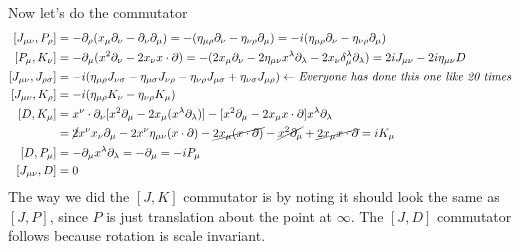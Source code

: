 \documentclass[11pt]{article}
\begin{document}
\begin{enumerate}
	Now let's do the commutator 
	\[
	\begin{aligned}
		\, [J_{\mu \nu}, P_\rho] &= - \partial_\rho (x_{\mu} \partial_\nu - \partial_\nu \partial_\mu) = - (\eta_{\mu \rho} \partial_\nu - \eta_{\nu \rho} \partial_\mu) = - i (\eta_{\mu \rho} \partial_\nu - \eta_{\nu \rho} \partial_\mu)\\
		[P_\mu, K_\nu] &= - \partial_{\mu} (x^2 \partial_\nu - 2 x_\nu x \cdot \partial) = - (2 x_\mu \partial_\nu - 2 \eta_{\mu \nu} x^\lambda \partial_\lambda - 2 x_\nu \delta_\mu^\lambda \partial_\lambda) = 2 i J_{\mu \nu} - 2 i \eta_{\mu \nu} D\\
		[J_{\mu \nu}, J_{\rho \sigma}] &= -i (\eta_{\mu \rho} J_{\nu \sigma} - \eta_{\mu \sigma} J_{\nu \rho} - \eta_{\nu \rho} J_{\mu \sigma} + \eta_{\nu \sigma} J_{\mu \rho}) \leftarrow\textit{Everyone has done this one like 20 times}\\
		[J_{\mu \nu}, K_\rho] &= -i (\eta_{\mu \rho} K_\nu - \eta_{\nu \rho} K_\mu ) \\
		[D, K_\mu] &= x^\nu \cdot \partial_\nu [x^2 \partial_\mu - 2 x_\mu (x^\lambda \partial_\lambda)] - [x^2 \partial_\mu - 2x_\mu x \cdot \partial] x^\lambda \partial_\lambda \\
		&= \cancel{2} x^\nu x_\nu \partial_\mu - 2 x^\nu \eta_{\mu \nu} (x \cdot \partial) - \cancel{2 x_\mu (x \cdot \partial)} - \cancel{x^2 \partial_\mu} + \cancel{2 x_\mu x \cdot \partial} =  i K_\mu\\
		[D, P_\mu] &= - \partial_\mu x^\lambda \partial_\lambda = - \partial_\mu = - i P_\mu\\
		[J_{\mu \nu}, D] &= 0
	\end{aligned}
	\]
	The way we did the $[J, K]$ commutator is by noting it should look the same as $[J, P]$, since $P$ is just translation about the point at $\infty$. The $[J,D]$ commutator follows because rotation is scale invariant.
	

\end{enumerate}
\end{document}
